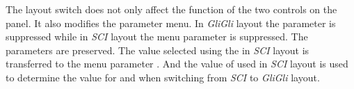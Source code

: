 The layout switch does not only affect the function of the two controls on the panel. It also modifies the parameter menu. In \textit{GliGli} layout the parameter \drive is suppressed while in \textit{SCI} layout the menu parameter \glide is suppressed. The parameters are preserved. The value selected using the \glidepot in \textit{SCI} layout is transferred to the menu parameter \glide. And the value of \drive used in \textit{SCI} layout is used to determine the value for \vola and \volb when switching from \textit{SCI} to \textit{GliGli} layout. 
